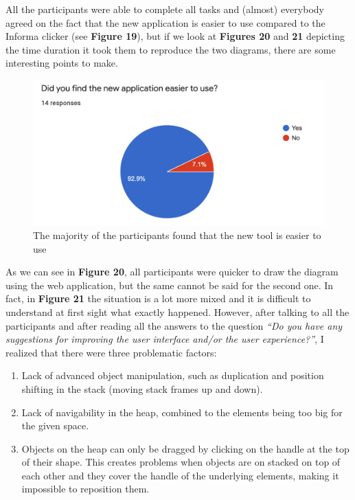\documentclass[]{usiinfbachelorproject}
\begin{document}
All the participants were able to complete all tasks and (almost) everybody agreed on the fact that the new application is easier to use compared to the Informa clicker (see \textbf{Figure 19}), but if we look at \textbf{Figures 20} and \textbf{21} depicting the time duration it took them to reproduce the two diagrams, there are some interesting points to make.\\

\begin{figure}[h!]
\centering
\includegraphics[scale=0.6]{figures/ease-of-use.png}
\caption {The majority of the participants found that the new tool is easier to use}
\end{figure}

\bigskip

\noindent As we can see in \textbf{Figure 20}, all participants were quicker to draw the diagram using the web application, but the same cannot be said for the second one. In fact, in \textbf{Figure 21} the situation is a lot more mixed and it is difficult to understand at first sight what exactly happened. However, after talking to all the participants and after reading all the answers to the question \emph{``Do you have any suggestions for improving the user interface and/or the user experience?''}, I realized that there were three problematic factors:

\begin{enumerate}
	\item Lack of advanced object manipulation, such as duplication and position shifting in the stack (moving stack frames up and down).
	\item Lack of navigability in the heap, combined to the elements being too big for the given space.
	\item Objects on the heap can only be dragged by clicking on the handle at the top of their shape. This creates problems when objects are on stacked on top of each other and they cover the handle of the underlying elements, making it impossible to reposition them.
\end{enumerate}
\end{document}
